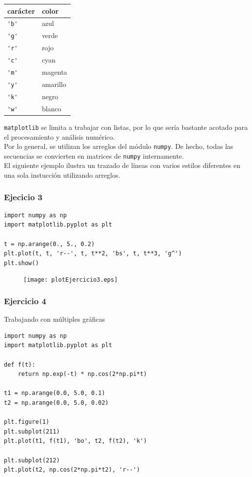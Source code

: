 \begin{frame}[fragile]
\begin{tabular}{l | l}
carácter & color \\ \hline
\verb|'b'| & azul \\ \hline
\verb|'g'| & verde \\ \hline
\verb|'r'| & rojo \\ \hline
\verb|'c'| & cyan \\ \hline
\verb|'m'| & magenta \\ \hline
\verb|'y'| & amarillo \\ \hline
\verb|'k'| & negro \\ \hline
\verb|'w'| & blanco
\end{tabular}
\end{frame}
\begin{frame}
\texttt{matplotlib} se limita a trabajar con listas, por lo que sería bastante acotado para el procesamiento y análisis numérico.
\\
\medskip
Por lo general, se utilizan los arreglos del módulo \texttt{numpy}. De hecho, todas las secuencias se convierten en matrices de \texttt{numpy} internamente.
\\
\medskip
El siguiente ejemplo ilustra un trazado de líneas con varios estilos diferentes en una sola instucción utilizando arreglos.
\end{frame}
\begin{frame}[fragile]
\frametitle{Ejecicio 3}
\begin{lstlisting}
import numpy as np
import matplotlib.pyplot as plt

t = np.arange(0., 5., 0.2)
plt.plot(t, t, 'r--', t, t**2, 'bs', t, t**3, 'g^')
plt.show()
\end{lstlisting}
\end{frame}
\begin{frame}[fragile]
\begin{figure}
	\centering
	\texttt{[image: plotEjercicio3.eps]}
\end{figure}
\end{frame}
\begin{frame}[fragile]
\frametitle{Ejercicio 4}
Trabajando con múltiples gráficas
\begin{lstlisting}
import numpy as np
import matplotlib.pyplot as plt

def f(t):
    return np.exp(-t) * np.cos(2*np.pi*t)

t1 = np.arange(0.0, 5.0, 0.1)
t2 = np.arange(0.0, 5.0, 0.02)

plt.figure(1)
plt.subplot(211)
plt.plot(t1, f(t1), 'bo', t2, f(t2), 'k')

plt.subplot(212)
plt.plot(t2, np.cos(2*np.pi*t2), 'r--')
\end{lstlisting}
\end{frame}
